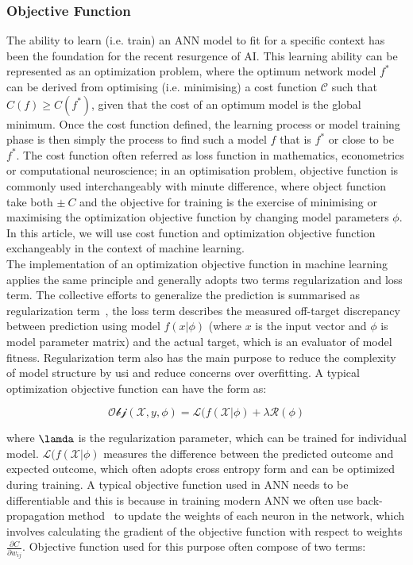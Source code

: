 \subsubsection{Objective Function}
The ability to learn (i.e. train) an ANN model to fit for a specific context has been the foundation for the recent resurgence of AI. This learning ability can be represented as an optimization problem, where the optimum network model $f^*$ can be derived from optimising (i.e. minimising) a cost function $\mathcal{C}$ such that $C(f) \geq C(f^*)$, given that the cost of an optimum model is the global minimum. Once the cost function defined, the learning process or model training phase is then simply the process to find such a model $f$ that is $f^*$ or close to be $f^*$. The cost function often referred as loss function in mathematics, econometrics or computational neuroscience; in an optimisation problem, objective function is commonly used interchangeably with minute difference, where object function take both $\pm~C$ and the objective for training is the exercise of minimising or maximising the optimization objective function by changing model parameters $\phi$. In this article, we will use cost function and optimization objective function exchangeably in the context of machine learning.
\\
The implementation of an optimization objective function in machine learning applies the same principle and generally adopts two terms regularization and loss term. The collective efforts to generalize the prediction is summarised as regularization term~\cite{goodfellow_2015}, the loss term describes the measured off-target discrepancy between prediction using model $f(x|\phi)$ (where $x$ is the input vector and $\phi$ is model parameter matrix) and the actual target, which is an evaluator of model fitness. Regularization term also has the main purpose to reduce the complexity of model structure by usi and reduce concerns over overfitting. A typical optimization objective function can have the form as:

\begin{equation}
    \mathcal{Obj}(\mathcal{X},y,\phi) = \mathcal{L}(f(\mathcal{X}|\phi) + \lambda \mathcal{R} (\phi) 
\end{equation}

where $\lamda$ is the regularization parameter, which can be trained for individual model. $\mathcal{L}(f(\mathcal{X}|\phi)$ measures the difference between the predicted outcome and expected outcome, which often adopts cross entropy form and can be optimized during training. A typical objective function used in ANN needs to be differentiable and this is because in training modern ANN we often use back-propagation method~\cite{LeCun_2015,Heaton_2017} to update the weights of each neuron in the network, which involves calculating the gradient of the objective function with respect to weights $\frac {\partial{C}} {\partial{w_{ij}}} $. Objective function used for this purpose often compose of two terms: 